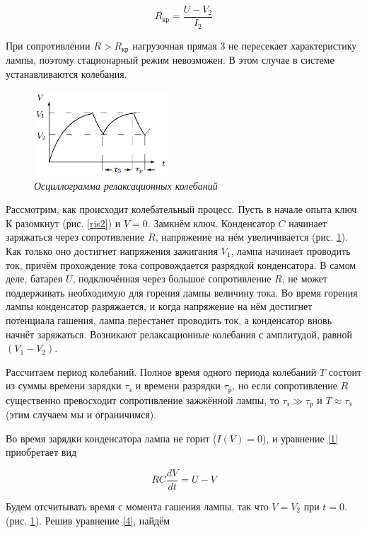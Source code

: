 \documentclass[a4paper,12pt]{article} %
\begin{document}
\begin{equation}\label{3}
R_\text{кр}=\frac{U-V_2}{I_2}
\end{equation}

При сопротивлении $ R>R_\text{кр} $ нагрузочная прямая 3 не пересекает характеристику лампы, поэтому стационарный режим невозможен. В этом случае в системе устанавливаются колебания.

\begin{figure}
	\includegraphics[width=5cm]{ris4.jpg}
	\caption{\textit{Осциллограмма релаксационных колебаний}}
	\label{ris4}
\end{figure}

Рассмотрим, как происходит колебательный процесс. Пусть в начале опыта ключ К разомкнут (рис. \ref{ris2}) и $ V = 0 $. Замкнём ключ. Конденсатор $ C $ начинает заряжаться через сопротивление $ R $, напряжение на нём увеличивается (рис. \ref{ris4}). Как только оно достигнет напряжения зажигания $ V_1 $, лампа начинает проводить ток, причём прохождение тока сопровождается разрядкой конденсатора. В самом деле, батарея $ U $, подключённая через большое сопротивление $ R $, не может поддерживать необходимую для горения лампы величину тока. Во время горения лампы конденсатор разряжается, и когда напряжение на нём достигнет потенциала гашения, лампа перестанет проводить ток, а конденсатор вновь начнёт заряжаться. Возникают релаксационные колебания с амплитудой, равной $ (V_1-V_2) $.

Рассчитаем период колебаний. Полное время одного периода колебаний $ T $ состоит из суммы времени зарядки $ \tau_\text{з} $ и времени разрядки $ \tau_\text{р} $, но если сопротивление $ R $ существенно превосходит сопротивление зажжённой лампы, то $ \tau_\text{з} \gg \tau_\text{р}  $ и $ T \approx \tau_\text{з} $ (этим случаем мы и ограничимся).

Во время зарядки конденсатора лампа не горит ($ I(V) = 0 $), и уравнение \eqref{1} приобретает вид

\begin{equation}\label{4}
RC\frac{dV}{dt}=U-V
\end{equation}

Будем отсчитывать время с момента гашения лампы, так что $ V = V_2 $ при $ t=0 $. (рис. \ref{ris4}). Решив уравнение \eqref{4}, найдём
\end{document}
